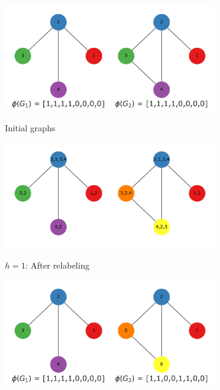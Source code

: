 \begin{figure}[htb!]
  \centering
  \begin{subfigure}[t]{0.49\linewidth}
  {\includegraphics[width=\linewidth]{assets/figures/wl_examples/wl_iteration_0.pdf}\label{fig:wl_example_0}}
  \caption{Initial graphs}
  \end{subfigure}
  \begin{subfigure}[t]{0.49\linewidth}
  {\includegraphics[width=\linewidth]{assets/figures/wl_examples/wl_iteration_1_stage_0_recolored}\label{fig:wl_example_1}}
  \caption{$h=1$: After relabeling}
  \end{subfigure}
  \begin{subfigure}[t]{0.49\linewidth}
  {\includegraphics[width=\linewidth]{assets/figures/wl_examples/wl_iteration_1_stage_1_compressed.pdf}\label{fig:wl_example_2}}

\end{subfigure}
\end{figure}
